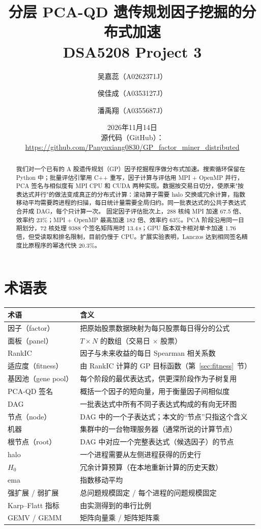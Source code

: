 \documentclass[11pt,a4paper,UTF8,fontset=fandol]{ctexart}
\title{分层 PCA-QD 遗传规划因子挖掘的分布式加速\\[4pt]
\large DSA5208 Project 3}
\author{吴嘉蕊（A0262371J） \and 侯佳成（A0353127J） \and 潘禹翔（A0355687J）}
\date{2026年11月14日\\[6pt]\normalsize 源代码（GitHub）：\url{https://github.com/Panyuxiang0830/GP_factor_miner_distributed}}
\begin{document}
\maketitle

\begin{abstract}
我们对一个已有的 A 股遗传规划（GP）因子挖掘程序做分布式加速。搜索循环保留在 Python 中；批量评估引擎用 C++ 重写，因子计算与评估用 MPI + OpenMP 并行，PCA 签名与相似度有 MPI CPU 和 CUDA 两种实现。数据按交易日切分，使原来"按表达式并行"的做法变成真正的分布式计算：滚动算子需要 halo 交换或冗余计算，指数移动平均需要跨进程的扫描，每日统计量需要全局归约。同一批表达式的公共子表达式合并成 DAG，每个只计算一次。
固定因子评估批次上，288 核纯 MPI 加速 67.5 倍、效率约 23\%；MPI + OpenMP 最高加速 182 倍、效率约 63\%。PCA 阶段沿用同一日期划分，72 核处理 9388 个签名矩阵用时 13.4\,s；GPU 版本双卡相对单卡加速 1.76 倍，但受读取和排名限制，目前仍慢于 CPU。扩展实验表明，Lanczos 达到相同签名精度比原程序的幂迭代快 20.3\%。
\end{abstract}

\section*{术语表}


\begin{tabular}{@{}ll@{}}
\toprule
术语 & 含义 \\
\midrule
因子（factor） & 把原始股票数据映射为每只股票每日得分的公式 \\
面板（panel） & $T\times N$ 的数组（交易日 $\times$ 股票） \\
RankIC & 因子与未来收益的每日 Spearman 相关系数 \\
适应度（fitness） & 由 RankIC 计算的 GP 目标函数（第~\ref{sec:fitness}~节） \\
基因池（gene pool） & 每个阶段的最优表达式，供更深阶段作为子树复用 \\
PCA-QD 签名 & 概括一个因子的短向量，用于衡量因子间相似度 \\
DAG & 一批表达式中所有不同子表达式构成的有向无环图 \\
节点（node） & DAG 中的一个子表达式；本文的“节点”只指这个含义 \\
机器 & 集群中的一台物理服务器（通常所说的计算节点） \\
根节点（root） & DAG 中对应一个完整表达式（候选因子）的节点 \\
halo & 一个进程需要从左侧进程获得的历史行 \\
$H_0$ & 冗余计算预算（在本地重新计算的历史天数） \\
ema & 指数移动平均 \\
强扩展 / 弱扩展 & 总问题规模固定 / 每个进程的问题规模固定 \\
Karp--Flatt 指标 & 由实测得到的串行比例 \\
GEMV / GEMM & 矩阵向量乘 / 矩阵矩阵乘 \\
\bottomrule
\end{tabular}
\end{document}

